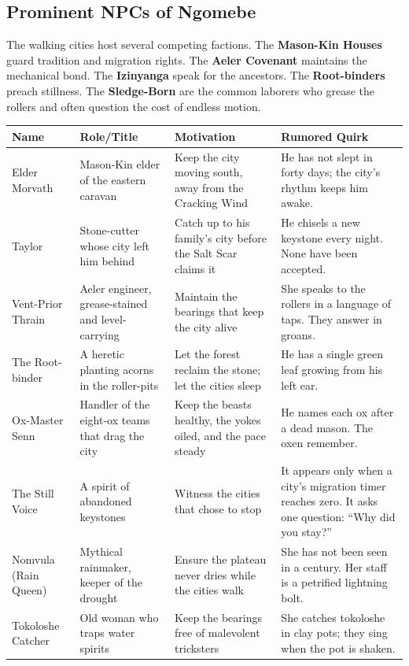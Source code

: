 \subsection*{Prominent NPCs of Ngomebe}
\label{sec:ngomebe-npcs}

The walking cities host several competing factions. The \textbf{Mason-Kin Houses} guard tradition and migration rights. The \textbf{Aeler Covenant} maintains the mechanical bond. The \textbf{Izinyanga} speak for the ancestors. The \textbf{Root-binders} preach stillness. The \textbf{Sledge-Born} are the common laborers who grease the rollers and often question the cost of endless motion.

\begin{longtable}{|p{}|p{}|p{}|p{}|}
\hline
\textbf{Name} & \textbf{Role/Title} & \textbf{Motivation} & \textbf{Rumored Quirk} \\
\hline
Elder Morvath & Mason-Kin elder of the eastern caravan & Keep the city moving south, away from the Cracking Wind & He has not slept in forty days; the city's rhythm keeps him awake. \\
\hline
Taylor & Stone-cutter whose city left him behind & Catch up to his family's city before the Salt Scar claims it & He chisels a new keystone every night. None have been accepted. \\
\hline
Vent-Prior Thrain & Aeler engineer, grease-stained and level-carrying & Maintain the bearings that keep the city alive & She speaks to the rollers in a language of taps. They answer in groans. \\
\hline
The Root-binder & A heretic planting acorns in the roller-pits & Let the forest reclaim the stone; let the cities sleep & He has a single green leaf growing from his left ear. \\
\hline
Ox-Master Senn & Handler of the eight-ox teams that drag the city & Keep the beasts healthy, the yokes oiled, and the pace steady & He names each ox after a dead mason. The oxen remember. \\
\hline
The Still Voice & A spirit of abandoned keystones & Witness the cities that chose to stop & It appears only when a city's migration timer reaches zero. It asks one question: ``Why did you stay?'' \\
\hline
Nomvula (Rain Queen) & Mythical rainmaker, keeper of the drought & Ensure the plateau never dries while the cities walk & She has not been seen in a century. Her staff is a petrified lightning bolt. \\
\hline
Tokoloshe Catcher & Old woman who traps water spirits & Keep the bearings free of malevolent tricksters & She catches tokoloshe in clay pots; they sing when the pot is shaken. \\
\hline
\end{longtable}

